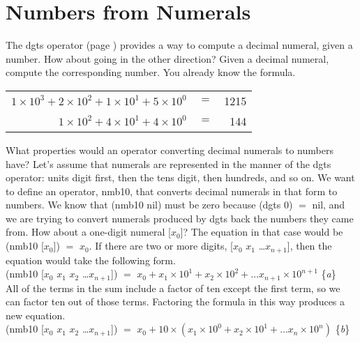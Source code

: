 \section{Numbers from Numerals}
\label{sec:numbers-from-numerals}
The \textsf{dgts} operator (page \pageref{dgts-defun})
provides a way to compute a decimal
numeral, given a number. How about going in the other direction?
Given a decimal numeral, compute the corresponding number.
You already know the formula.
\begin{samepage}
\begin{center}
\begin{tabular}{rrr}
$1 \times 10^3 + 2 \times 10^2 + 1 \times 10^1 + 5 \times 10^0$ &$=$ & 1215 \\
$1 \times 10^2 + 4 \times 10^1 + 4 \times 10^0$                 &$=$ &  144 \\
\end{tabular}
\end{center}
\end{samepage}

What properties would an operator
converting decimal numerals to numbers have?
Let's assume that numerals are represented
in the manner of the \textsf{dgts} operator:
units digit first,
then the tens digit, then hundreds, and so on.
We want to define an operator, \textsf{nmb10},
that converts decimal numerals in that form to numbers.
We know that \textsf{(nmb10 nil)} must be zero
because \textsf{(dgts 0)} $=$ \textsf{nil},
and we are trying to convert numerals produced by \textsf{dgts}
back the numbers they came from.
How about a one-digit numeral \textsf{[$x_0$]}?
The equation in that case would be \textsf{(nmb10 [$x_0$])} $=$ $x_0$.
If there are two or more digits,
\textsf{[$x_0$ $x_1$ \dots $x_{n+1}$]},
then the equation would take the following form.\\
\hspace*{1cm}
\textsf{(nmb10 [$x_0$ $x_1$ $x_2$ \dots $x_{n+1}$])} $=$
$x_0 + x_1 \times 10^1 + x_2 \times 10^2 + \dots x_{n+1} \times 10^{n+1}$ \hfill \{\emph{a}\}\\

All of the terms in the sum
include a factor of ten except the first term,
so we can factor ten out of those terms.
Factoring the formula in this way produces a new equation.\\
\hspace*{1cm}
\textsf{(nmb10 [$x_0$ $x_1$ $x_2$ \dots $x_{n+1}$])} $=$
$x_0 + 10 \times (x_1 \times 10^0 + x_2 \times 10^1 + \dots x_n \times 10^n)$ \hfill \{\emph{b}\}\\

